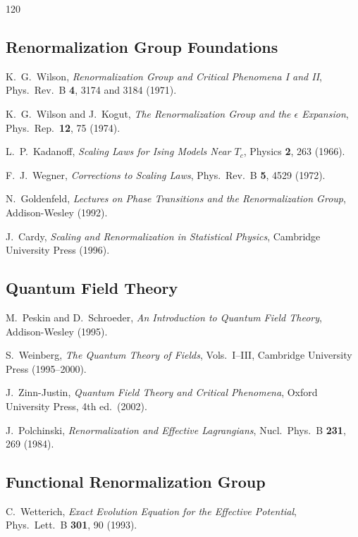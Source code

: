 \documentclass[11pt, twoside, openright]{book}
\theoremstyle{dotted}
\theoremstyle{definition}
\begin{document}
\begin{thebibliography}{120}

\subsection*{Renormalization Group Foundations}

K.~G.~Wilson,
\textit{Renormalization Group and Critical Phenomena I and II},
Phys.\ Rev.\ B \textbf{4}, 3174 and 3184 (1971).

K.~G.~Wilson and J.~Kogut,
\textit{The Renormalization Group and the $\epsilon$ Expansion},
Phys.\ Rep.\ \textbf{12}, 75 (1974).

L.~P.~Kadanoff,
\textit{Scaling Laws for Ising Models Near $T_c$},
Physics \textbf{2}, 263 (1966).

F.~J.~Wegner,
\textit{Corrections to Scaling Laws},
Phys.\ Rev.\ B \textbf{5}, 4529 (1972).

N.~Goldenfeld,
\textit{Lectures on Phase Transitions and the Renormalization Group},
Addison-Wesley (1992).

J.~Cardy,
\textit{Scaling and Renormalization in Statistical Physics},
Cambridge University Press (1996).

\subsection*{Quantum Field Theory}

M.~Peskin and D.~Schroeder,
\textit{An Introduction to Quantum Field Theory},
Addison-Wesley (1995).

S.~Weinberg,
\textit{The Quantum Theory of Fields}, Vols.\ I--III,
Cambridge University Press (1995--2000).

J.~Zinn-Justin,
\textit{Quantum Field Theory and Critical Phenomena},
Oxford University Press, 4th ed.\ (2002).

J.~Polchinski,
\textit{Renormalization and Effective Lagrangians},
Nucl.\ Phys.\ B \textbf{231}, 269 (1984).

\subsection*{Functional Renormalization Group}

C.~Wetterich,
\textit{Exact Evolution Equation for the Effective Potential},
Phys.\ Lett.\ B \textbf{301}, 90 (1993).


\end{thebibliography}
\end{document}
